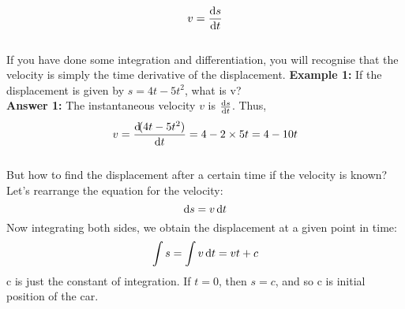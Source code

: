 \begin{equation}
v = \frac{\operatorname{d}\! s}{\operatorname{d}\! t} 
\label{inst_v}
\end{equation}\\
If you have done some integration and differentiation, you will recognise that the velocity is simply the time derivative of the displacement. \nll
\textbf{Example 1:} If the displacement is given by $s = 4t - 5 t^2$, what is v?\\
\textbf{Answer 1:} The instantaneous velocity $v$ is $\frac{\operatorname{d}\! s}{\operatorname{d}\! t}$. Thus,
\begin{equation}
v = \frac{\operatorname{d}\! (4t - 5 t^2)}{\operatorname{d}\! t} = 4 - 2 \times 5 t = 4-10t
\end{equation}
\\
But how to find the displacement after a certain time if the velocity is known? Let's rearrange the equation for the velocity:
 \begin{equation}
\operatorname{d}\! s = v \operatorname{d}\! t 
\label{inst_s}
\end{equation}
Now integrating both sides, we obtain the displacement at a given point in time:
  \begin{equation}
\int s = \int v \operatorname{d}\! t = vt + c
\end{equation}
c is just the constant of integration. If $t=0$, then $s=c$, and so c is initial position of the car.

